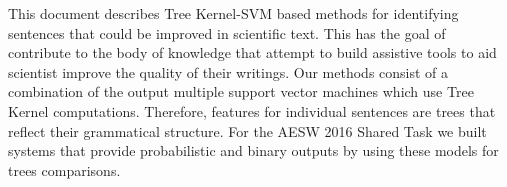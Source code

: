 This document describes Tree Kernel-SVM based methods for  identifying sentences that could be improved in scientific text. This has the goal of contribute to the body of knowledge that attempt to build assistive tools to aid scientist improve the quality of their writings. Our methods consist of a combination of the output multiple support vector machines which use Tree Kernel computations. Therefore, features for individual sentences are trees that reflect their grammatical structure. For the AESW 2016 Shared Task we built systems that provide probabilistic and binary outputs by using these models for trees comparisons.
